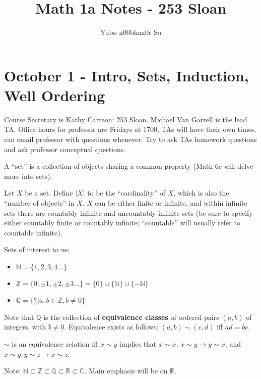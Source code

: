 \documentclass{report}
\begin{document}
\title{Math 1a Notes - 253 Sloan}
\author{Yubo n00bhax0r Su}
\date{ }

\maketitle

\tableofcontents

\chapter{October 1 - Intro, Sets, Induction, Well Ordering}
Course Secretary is Kathy Carreon: 253 Sloan. Michael Van Garrell is the lead TA. Office hours for professor are Fridays at 1700, TAs will have their own times, can email professor with questions whenever. Try to ask TAs homework questions and ask professor conceptual questions.

A "`set"' is a collection of objects sharing a common property (Math 6c will delve more into sets). 
 
Let $X$ be a set. Define $|X|$ to be the "`cardinality"' of $X$, which is also the "`number of objects"' in $X$. $X$ can be either finite or infinite, and within infinite sets there are countably infinite and uncountably infinite sets (be sure to specify either countably finite or countably infinite; "`countable"' will usually refer to countable infinite).

Sets of interest to us:

\begin{itemize}
\item $\mathbb{N} = \{1,2,3,4...\}$
\item $\mathbb{Z} = \{0, \pm 1, \pm 2, \pm 3...\} = \{0\} \cup \{\mathbb{N}\} \cup \{-\mathbb{N}\}$
\item $\mathbb{Q} = \{\frac{a}{b} \vert a,b \in \mathbb{Z}, b \neq 0\}$
\end{itemize}

Note that $\mathbb{Q}$ is the collection of \textbf{equivalence classes} of ordered pairs $(a,b)$ of integers, with $b \neq 0$. Equivalence exists as follows: $(a,b) \sim (c,d)$ iff $ad = bc$.

$\sim$ is an equivalence relation iff $x\sim y$ implies that $x\sim x$, $x\sim y \rightarrow y\sim x$, and $x\sim y, y\sim z \rightarrow x\sim z$. 

Note: $\mathbb{N} \subset \mathbb{Z} \subset \mathbb{Q} \subset \mathbb{R} \subset \mathbb{C}$. Main emphasis will be on $\mathbb{R}$. 
\end{document}
